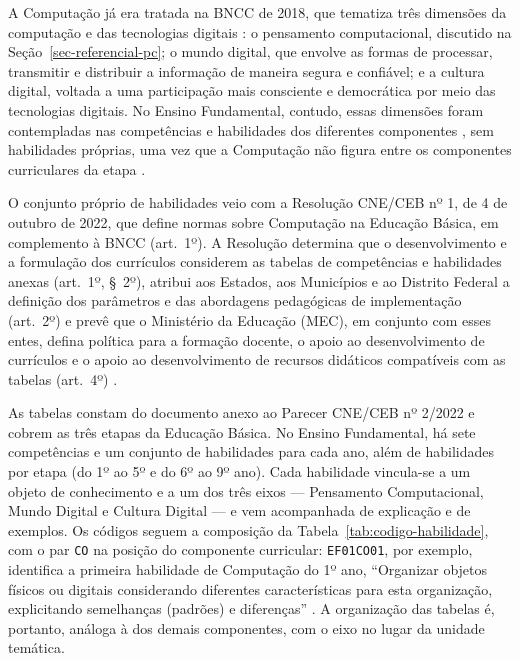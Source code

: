 A Computação já era tratada na BNCC de 2018, que tematiza três dimensões da computação e das tecnologias digitais \cite[p.~473--474]{brasil2018bncc}: o pensamento computacional, discutido na Seção~\ref{sec-referencial-pc}; o mundo digital, que envolve as formas de processar, transmitir e distribuir a informação de maneira segura e confiável; e a cultura digital, voltada a uma participação mais consciente e democrática por meio das tecnologias digitais. No Ensino Fundamental, contudo, essas dimensões foram contempladas nas competências e habilidades dos diferentes componentes \cite[p.~474]{brasil2018bncc}, sem habilidades próprias, uma vez que a Computação não figura entre os componentes curriculares da etapa \cite[p.~27]{brasil2018bncc}.

O conjunto próprio de habilidades veio com a Resolução CNE/CEB nº 1, de 4 de outubro de 2022, que define normas sobre Computação na Educação Básica, em complemento à BNCC (art.~1º). A Resolução determina que o desenvolvimento e a formulação dos currículos considerem as tabelas de competências e habilidades anexas (art.~1º, §~2º), atribui aos Estados, aos Municípios e ao Distrito Federal a definição dos parâmetros e das abordagens pedagógicas de implementação (art.~2º) e prevê que o Ministério da Educação (MEC), em conjunto com esses entes, defina política para a formação docente, o apoio ao desenvolvimento de currículos e o apoio ao desenvolvimento de recursos didáticos compatíveis com as tabelas (art.~4º) \cite{brasil2022computacao}.

As tabelas constam do documento anexo ao Parecer CNE/CEB nº 2/2022 \cite{brasil2022complemento} e cobrem as três etapas da Educação Básica. No Ensino Fundamental, há sete competências e um conjunto de habilidades para cada ano, além de habilidades por etapa (do 1º ao 5º e do 6º ao 9º ano). Cada habilidade vincula-se a um objeto de conhecimento e a um dos três eixos --- Pensamento Computacional, Mundo Digital e Cultura Digital --- e vem acompanhada de explicação e de exemplos. Os códigos seguem a composição da Tabela~\ref{tab:codigo-habilidade}, com o par \texttt{CO} na posição do componente curricular: \texttt{EF01CO01}, por exemplo, identifica a primeira habilidade de Computação do 1º ano, ``Organizar objetos físicos ou digitais considerando diferentes características para esta organização, explicitando semelhanças (padrões) e diferenças'' \cite[p.~12]{brasil2022complemento}. A organização das tabelas é, portanto, análoga à dos demais componentes, com o eixo no lugar da unidade temática.

